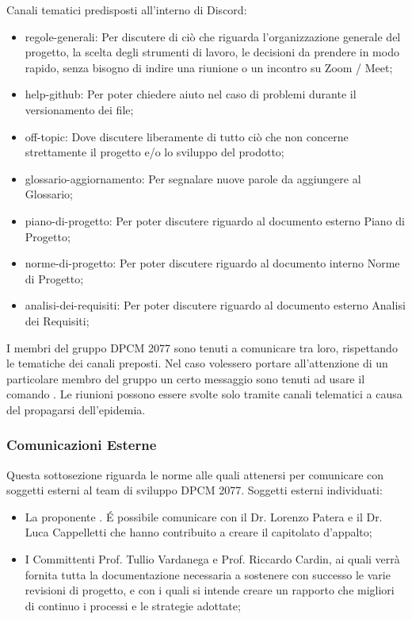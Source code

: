 Canali tematici predisposti all'interno di Discord:
\begin{itemize}
\item{regole-generali: Per discutere di ciò che riguarda l’organizzazione generale del progetto, la scelta degli strumenti di lavoro, le decisioni da prendere in modo rapido, senza bisogno di indire una riunione o un incontro  su Zoom / Meet;}
\item{help-github: Per poter chiedere aiuto nel caso di problemi durante il versionamento dei file;}
\item{off-topic: Dove discutere liberamente di tutto ciò che non concerne strettamente il progetto e/o lo sviluppo del prodotto;}
\item{glossario-aggiornamento: Per segnalare nuove parole da aggiungere al Glossario;}
\item{piano-di-progetto: Per poter discutere riguardo al documento esterno Piano di Progetto;}
\item{norme-di-progetto: Per poter discutere riguardo al documento interno Norme di Progetto;}
\item{analisi-dei-requisiti: Per poter discutere riguardo al documento esterno Analisi dei Requisiti;}
\end{itemize}
I membri del gruppo DPCM 2077 sono tenuti a comunicare tra loro, rispettando le tematiche dei canali preposti. Nel caso volessero portare all’attenzione di un particolare membro del gruppo un certo messaggio sono tenuti ad usare
il comando \@userName.
Le riunioni possono essere svolte solo tramite canali telematici a causa del propagarsi dell'epidemia.

\subsubsection{Comunicazioni Esterne}
Questa sottosezione riguarda le norme alle quali attenersi per comunicare con soggetti esterni al team di sviluppo DPCM 2077.
Soggetti esterni individuati:
\begin{itemize}
\item{La proponente . \'E possibile comunicare con il Dr. Lorenzo Patera e il Dr. Luca Cappelletti che hanno contribuito a creare il capitolato d'appalto;}
\item{I Committenti Prof. Tullio Vardanega e Prof. Riccardo Cardin, ai quali verrà fornita tutta la documentazione necessaria a sostenere con successo le varie revisioni di progetto, e con i quali si intende creare un rapporto che migliori 
di continuo i processi e le strategie adottate;}
\end{itemize}

